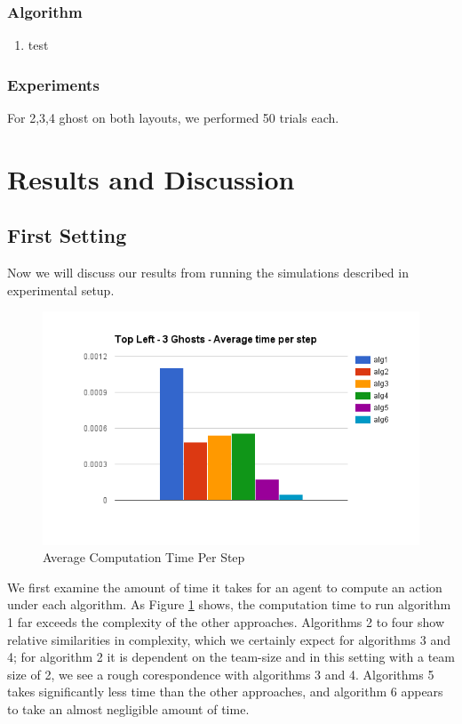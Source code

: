 \documentclass[11pt]{article}
\begin{document}
\begin{multicols}{2}
\subsubsection{Algorithm}

\begin{enumerate}[leftmargin=0.25cm]
\item
test

\end{enumerate}

\subsubsection{Experiments}

For 2,3,4 ghost on both layouts, we performed 50 trials each.  

\section{Results and Discussion}

\subsection{First Setting}
Now we will discuss our results from running the simulations described in experimental setup. 


\begin{figure}[H]
	\includegraphics[width=\columnwidth]{time.png}
	\caption{Average Computation Time Per Step}
	\label{fig:averagecomputation}
\end{figure}	

We first examine the amount of time it takes for an agent to compute an action under each algorithm. As Figure \ref{fig:averagecomputation} shows, the computation time to run algorithm 1 far exceeds the complexity of the other approaches. Algorithms 2 to four show relative similarities in complexity, which we certainly expect for algorithms 3 and 4; for algorithm 2 it is dependent on the team-size and in this setting with a team size of 2, we see a rough corespondence with algorithms 3 and 4. Algorithms 5 takes significantly less time than the other approaches, and algorithm 6 appears to take an almost negligible amount of time. 


\end{multicols}
\end{document}
